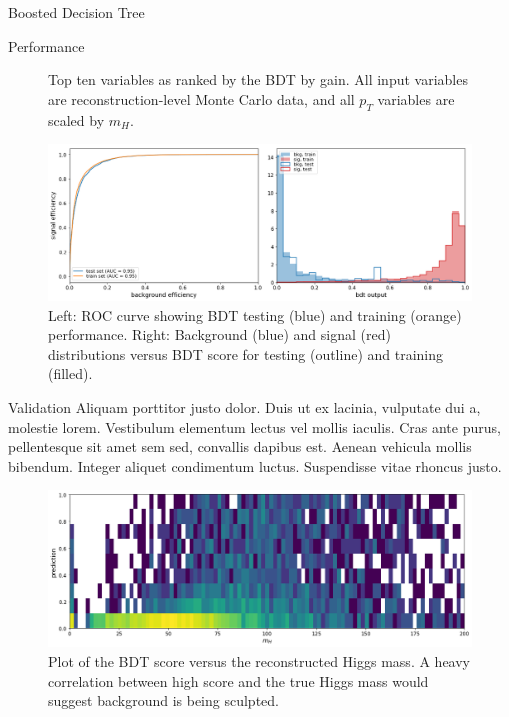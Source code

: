 \begin{section}{Boosted Decision Tree}
\begin{subsection}{Performance}
\begin{figure}[htb]
\begin{center}

\end{center}
\caption{Top ten variables as ranked by the BDT by gain. All input variables are reconstruction-level Monte Carlo data, and all $p_{T}$ variables are scaled by $m_{H}.$}
\label{fig:bdt-vars}
\end{figure}

\begin{figure}[htb]
\begin{center}
\includegraphics[width=.95\linewidth]{Dissertation/fig/bdt-performance.png}
\end{center}
\caption{Left: ROC curve showing BDT testing (blue) and training (orange) performance. Right: Background (blue) and signal (red) distributions versus BDT score for testing (outline) and training (filled).}
\label{fig:bdt-performance}
\end{figure}
\end{subsection}

\begin{subsection}{Validation}
Aliquam porttitor justo dolor. Duis ut ex lacinia, vulputate dui a, molestie lorem. Vestibulum elementum lectus vel mollis iaculis. Cras ante purus, pellentesque sit amet sem sed, convallis dapibus est. Aenean vehicula mollis bibendum. Integer aliquet condimentum luctus. Suspendisse vitae rhoncus justo.

\begin{figure}[htb]
\begin{center}
\includegraphics[width=.95\linewidth]{Dissertation/fig/bdt-bkgsculpt1.png}
\end{center}
\caption{Plot of the BDT score versus the reconstructed Higgs mass. A heavy correlation between high score and the true Higgs mass would suggest background is being sculpted.}
\label{fig:bdt-bkgsculpt1}
\end{figure}


\end{subsection}
\end{section}
